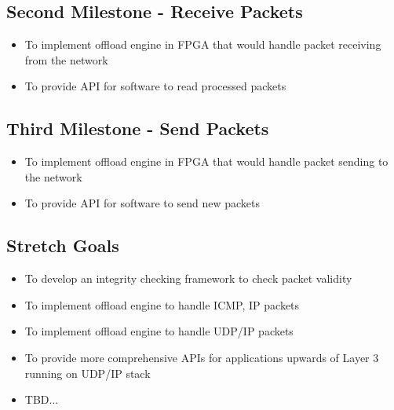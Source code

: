 \documentclass[a4paper,11pt]{scrartcl}
\begin{document}
\subsection{Second Milestone - Receive Packets}
\begin{itemize}
    \item To implement offload engine in FPGA that would handle packet receiving from the network
    \item To provide API for software to read processed packets
\end{itemize}

\subsection{Third Milestone - Send Packets}
\begin{itemize}
    \item To implement offload engine in FPGA that would handle packet sending to the network
    \item To provide API for software to send new packets
\end{itemize}

\subsection{Stretch Goals}
\begin{itemize}
    \item To develop an integrity checking framework to check packet validity
    \item To implement offload engine to handle ICMP, IP packets
    \item To implement offload engine to handle UDP/IP packets
    \item To provide more comprehensive APIs for applications upwards of Layer 3 running on UDP/IP stack
    \item TBD...
\end{itemize}



\end{document}
